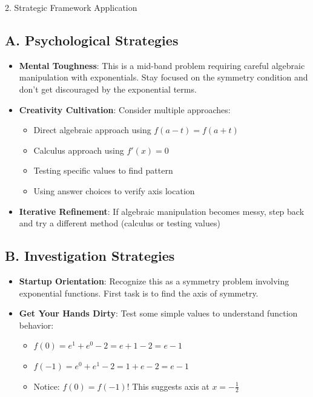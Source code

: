 \documentclass[12pt]{article}
\begin{document}
\begin{strategybox}{2. Strategic Framework Application}

\subsection*{A. Psychological Strategies}
\begin{itemize}[leftmargin=*]
    \item \textbf{Mental Toughness}: This is a mid-band problem requiring careful algebraic manipulation with exponentials. Stay focused on the symmetry condition and don't get discouraged by the exponential terms.
    
    \item \textbf{Creativity Cultivation}: Consider multiple approaches:
    \begin{itemize}
        \item Direct algebraic approach using $f(a-t) = f(a+t)$
        \item Calculus approach using $f'(x) = 0$
        \item Testing specific values to find pattern
        \item Using answer choices to verify axis location
    \end{itemize}
    
    \item \textbf{Iterative Refinement}: If algebraic manipulation becomes messy, step back and try a different method (calculus or testing values)
\end{itemize}

\subsection*{B. Investigation Strategies}
\begin{itemize}[leftmargin=*]
    \item \textbf{Startup Orientation}: Recognize this as a symmetry problem involving exponential functions. First task is to find the axis of symmetry.
    
    \item \textbf{Get Your Hands Dirty}: Test some simple values to understand function behavior:
    \begin{itemize}
        \item $f(0) = e^1 + e^0 - 2 = e + 1 - 2 = e - 1$
        \item $f(-1) = e^0 + e^1 - 2 = 1 + e - 2 = e - 1$
        \item Notice: $f(0) = f(-1)$! This suggests axis at $x = -\frac{1}{2}$
    \end{itemize}
    

\end{itemize}
\end{strategybox}
\end{document}
